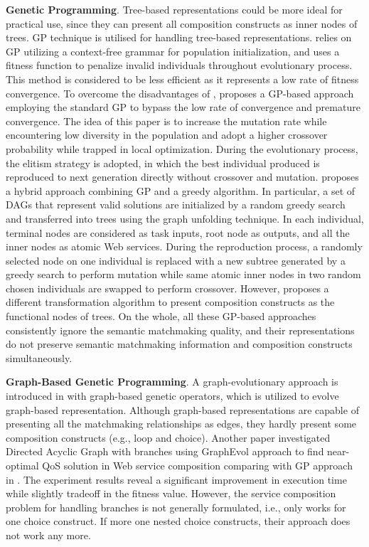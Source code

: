 \textbf{Genetic Programming}.
Tree-based representations could be more ideal for practical use, since they can present all composition constructs as inner nodes of trees. GP technique is utilised for handling tree-based representations. \cite {rodriguez2010composition} relies on GP utilizing a context-free grammar for population initialization, and uses a fitness function to penalize invalid individuals throughout evolutionary process. This method is considered to be less efficient as it represents a low rate of fitness convergence. To overcome the disadvantages of \cite {rodriguez2010composition}, \cite{yu2013adaptive} proposes a GP-based approach employing the standard GP to bypass the low rate of convergence and premature convergence. The idea of this paper is to increase the mutation rate while encountering low diversity in the population and adopt a higher crossover probability while trapped in local optimization.  During the evolutionary process, the elitism strategy is adopted, in which the best individual produced is reproduced to next generation directly without crossover and mutation. \cite{ma2015hybrid} proposes a hybrid approach combining GP and a greedy algorithm. In particular, a set of DAGs that represent valid solutions are initialized by a random greedy search and transferred into trees using the graph unfolding technique.  In each individual,  terminal nodes are considered as task inputs,  root node as  outputs, and all the inner nodes as atomic Web services. During the reproduction process,  a randomly selected node on one individual is replaced with a new subtree generated by a greedy search to perform mutation while same atomic inner nodes in two random chosen individuals are swapped to perform crossover. However, \cite{da2016genetic} proposes a different transformation algorithm to present composition constructs as the functional nodes of trees. On the whole, all these GP-based approaches \cite{ma2015hybrid,rodriguez2010composition,da2016genetic,yu2013adaptive} consistently ignore the semantic matchmaking quality, and their representations do not preserve semantic matchmaking information and composition constructs simultaneously. 

\textbf{Graph-Based Genetic Programming}.
A graph-evolutionary approach is introduced in \cite{da2015graphevol} with graph-based genetic operators, which is utilized to evolve graph-based representation. Although graph-based representations are capable of presenting all the matchmaking relationships as edges, they hardly present some composition constructs (e.g., loop and choice). Another paper \cite{da2016handling} investigated Directed Acyclic Graph with branches using GraphEvol approach \cite{da2015graphevol} to find near-optimal QoS solution in Web service composition comparing with GP approach in \cite{da2015gp}. The experiment results reveal a significant improvement in execution time while slightly tradeoff in the fitness value. However, the service composition problem for handling branches is not generally formulated, i.e., only works for one choice construct. If more one nested choice constructs, their approach does not work any more.

